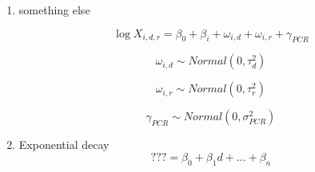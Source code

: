 \documentclass[12pt]{article}
\begin{document}
\begin{enumerate}
	\item something else

		\begin{equation}
		\log X_{i,d,r} = \beta_0 + \beta_i + \omega_{i,d} + \omega_{i,r} + \gamma_{PCR}
		\end{equation}

		\begin{equation}
		\omega_{i,d} \sim Normal(0,\tau_d^2)
		\end{equation}

		\begin{equation}
		\omega_{i,r} \sim Normal(0,\tau_r^2)
		\end{equation}

		\begin{equation}
		\gamma_{PCR} \sim Normal(0,\sigma^2_{PCR})
		\end{equation}

	\item Exponential decay
		\begin{equation}
		??? = \beta_0 + \beta_1d + \ldots + \beta_n
		\end{equation}


\end{enumerate}
\end{document}
